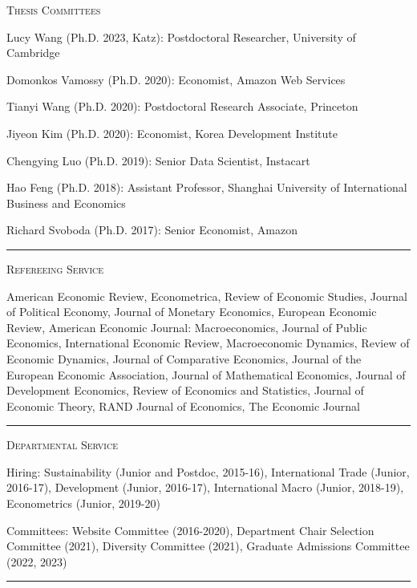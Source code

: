 \documentclass{article}
\begin{document}
\parbox{\textwidth}{
\parbox[t]{0.28\textwidth}{ \raggedright \noindent \textsc{ Thesis Committees } }
\parbox[t]{0.72\textwidth}{ \raggedright

Lucy Wang (Ph.D. 2023, Katz): Postdoctoral Researcher, University of Cambridge
\vspace{0.27cm}

Domonkos Vamossy (Ph.D. 2020): Economist, Amazon Web Services
\vspace{0.27cm}

Tianyi Wang (Ph.D. 2020): Postdoctoral Research Associate, Princeton
\vspace{0.27cm}

Jiyeon Kim (Ph.D. 2020): Economist, Korea Development Institute
\vspace{0.27cm}

Chengying Luo (Ph.D. 2019): Senior Data Scientist, Instacart
\vspace{0.27cm}

Hao Feng (Ph.D. 2018): Assistant Professor, Shanghai University of International Business and Economics
\vspace{0.27cm}

Richard Svoboda (Ph.D. 2017): Senior Economist, Amazon
\vspace{0.27cm}

}
\textcolor{light-gray}{\hrule}
}
\vspace{0.3cm}

\parbox{\textwidth}{
\parbox[t]{0.28\textwidth}{ \raggedright \noindent \textsc{ Refereeing Service } }
\parbox[t]{0.72\textwidth}{ \raggedright

American Economic Review, Econometrica, Review of Economic Studies, Journal of Political Economy, Journal of Monetary Economics, European Economic Review, American Economic Journal: Macroeconomics, Journal of Public Economics, International Economic Review, Macroeconomic Dynamics, Review of Economic Dynamics, Journal of Comparative Economics, Journal of the European Economic Association, Journal of Mathematical Economics, Journal of Development Economics, Review of Economics and Statistics, Journal of Economic Theory, RAND Journal of Economics, The Economic Journal
\vspace{0.27cm}

}
\textcolor{light-gray}{\hrule}
}
\vspace{0.3cm}

\parbox{\textwidth}{
\parbox[t]{0.28\textwidth}{ \raggedright \noindent \textsc{ Departmental Service } }
\parbox[t]{0.72\textwidth}{ \raggedright

Hiring: Sustainability (Junior and Postdoc, 2015-16), International Trade (Junior, 2016-17), Development (Junior, 2016-17), International Macro (Junior, 2018-19), Econometrics (Junior, 2019-20)
\vspace{0.27cm}

Committees: Website Committee (2016-2020), Department Chair Selection Committee (2021), Diversity Committee (2021), Graduate Admissions Committee (2022, 2023)
\vspace{0.27cm}

}
\textcolor{light-gray}{\hrule}
}
\vspace{0.3cm}
\end{document}
